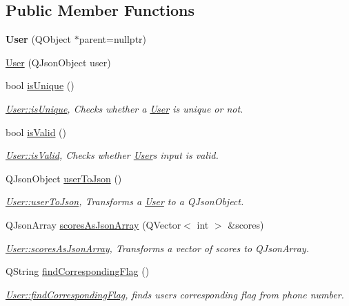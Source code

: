 \subsection*{Public Member Functions}
\begin{DoxyCompactItemize}
\item 
\mbox{\label{classUser_ae90821c4c8cc9a5a370f0ad6157adcc1}} 
{\bfseries User} (Q\+Object $\ast$parent=nullptr)
\item 
\hyperlink{classUser_a78cce0bf7baacf9dcc0ecba524f67b87}{User} (Q\+Json\+Object user)
\item 
bool \hyperlink{classUser_a9e1fe4ac5c94a98f82ca09fa0982e029}{is\+Unique} ()
\begin{DoxyCompactList}\small\item\em \hyperlink{classUser_a9e1fe4ac5c94a98f82ca09fa0982e029}{User\+::is\+Unique}, Checks whether a \hyperlink{classUser}{User} is unique or not. \end{DoxyCompactList}\item 
bool \hyperlink{classUser_a7fff50444765760051f4ae6fb3d58e16}{is\+Valid} ()
\begin{DoxyCompactList}\small\item\em \hyperlink{classUser_a7fff50444765760051f4ae6fb3d58e16}{User\+::is\+Valid}, Checks whether \hyperlink{classUser}{User}\textquotesingle{}s input is valid. \end{DoxyCompactList}\item 
Q\+Json\+Object \hyperlink{classUser_a2edd9754d400f097b4aa88bc087ace8b}{user\+To\+Json} ()
\begin{DoxyCompactList}\small\item\em \hyperlink{classUser_a2edd9754d400f097b4aa88bc087ace8b}{User\+::user\+To\+Json}, Transforms a \hyperlink{classUser}{User} to a Q\+Json\+Object. \end{DoxyCompactList}\item 
Q\+Json\+Array \hyperlink{classUser_af14a1fba45613d9586d8951f13f9c4a0}{scores\+As\+Json\+Array} (Q\+Vector$<$ int $>$ \&scores)
\begin{DoxyCompactList}\small\item\em \hyperlink{classUser_af14a1fba45613d9586d8951f13f9c4a0}{User\+::scores\+As\+Json\+Array}, Transforms a vector of scores to Q\+Json\+Array. \end{DoxyCompactList}\item 
Q\+String \hyperlink{classUser_ac57cd256ecaaaaabc2475647902740ba}{find\+Corresponding\+Flag} ()
\begin{DoxyCompactList}\small\item\em \hyperlink{classUser_ac57cd256ecaaaaabc2475647902740ba}{User\+::find\+Corresponding\+Flag}, finds users corresponding flag from phone number. \end{DoxyCompactList}\end{DoxyCompactItemize}
